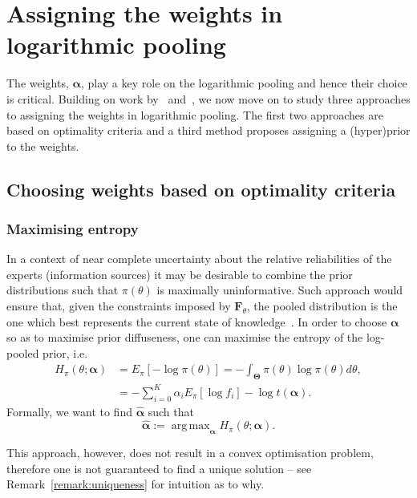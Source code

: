 \documentclass[a4paper, notitlepage, 10pt]{article}
\DeclareMathOperator*{\argmax}{arg\,max}
\begin{document}
\section{Assigning the weights in logarithmic pooling}
\label{sec:weights}

The weights, $\boldsymbol \alpha$, play a key role on the logarithmic pooling and hence their choice is critical.
Building on work by~\cite{poole2000,rufo2012A,rufo2012B} and~\cite{abbas2009}, we now move on to study three approaches to assigning the weights in logarithmic pooling.
The first two approaches are based on optimality criteria and a third method proposes assigning a (hyper)prior to the weights.

\subsection{Choosing weights based on optimality criteria}

\subsubsection{Maximising entropy}
\label{sec:maxent}

In a context of near complete uncertainty about the relative reliabilities of the experts (information sources) it may be desirable to combine the prior distributions such that $\pi(\theta)$ is maximally uninformative. %
Such approach would ensure that, given the constraints imposed by $\mathbf{F}_{\theta}$, the pooled distribution is the one which best represents the current state of knowledge~\citep{jaynes1957,savchuk1994}.
In order to choose $\boldsymbol\alpha$ so as to maximise prior 
diffuseness, one can maximise the entropy of the log-pooled prior, i.e.
\begin{align}
\nonumber
H_{\pi}(\theta; \boldsymbol\alpha) &= E_{\pi}\left[-\log \pi(\theta) \right] =-\int_{\boldsymbol\Theta}\pi(\theta)\log\pi(\theta)d\theta,\\
\label{eq:entropypiB}
&= -\sum_{i=0}^{K} \alpha_i E_{\pi}[\log f_i] - \log t(\boldsymbol\alpha).
\end{align}
Formally, we want to find $\hat{\boldsymbol\alpha}$ such that
\begin{equation}
\label{eq:argmaxEnt}
 \hat{\boldsymbol\alpha}:= \argmax_{\boldsymbol\alpha} H_{\pi}(\theta; \boldsymbol\alpha).
\end{equation}

This approach, however, does not result in a convex optimisation problem, therefore one is not guaranteed to find a unique solution -- see Remark~\ref{remark:uniqueness} for intuition as to why.
\end{document}

